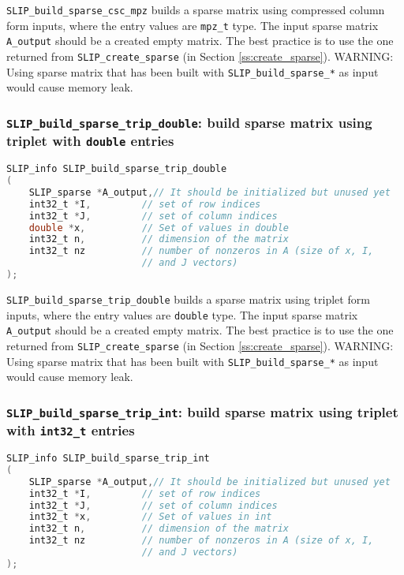 \documentclass[11pt]{article}
\theoremstyle{definition}
\begin{document}
\verb|SLIP_build_sparse_csc_mpz| builds a sparse matrix using compressed column form inputs, where the entry values are \verb|mpz_t| type. The input sparse matrix \verb|A_output| should be a created empty matrix. The best practice is to use the one returned from \verb|SLIP_create_sparse| (in Section \ref{ss:create_sparse}). WARNING: Using sparse matrix that has been built with \verb|SLIP_build_sparse_*| as input would cause memory leak.

\cprotect\subsubsection{\verb|SLIP_build_sparse_trip_double|: build sparse matrix using triplet with \verb|double| entries}\label{s:user:build_sparse_trip_double}
\begin{lstlisting}[language=C,frame=single]
SLIP_info SLIP_build_sparse_trip_double
(
    SLIP_sparse *A_output,// It should be initialized but unused yet
    int32_t *I,         // set of row indices
    int32_t *J,         // set of column indices
    double *x,          // Set of values in double
    int32_t n,          // dimension of the matrix
    int32_t nz          // number of nonzeros in A (size of x, I,
                        // and J vectors)
);
\end{lstlisting}

\verb|SLIP_build_sparse_trip_double| builds a sparse matrix using triplet form inputs, where the entry values are \verb|double| type. The input sparse matrix \verb|A_output| should be a created empty matrix. The best practice is to use the one returned from \verb|SLIP_create_sparse| (in Section \ref{ss:create_sparse}). WARNING: Using sparse matrix that has been built with \verb|SLIP_build_sparse_*| as input would cause memory leak.

\cprotect\subsubsection{\verb|SLIP_build_sparse_trip_int|: build sparse matrix using triplet with \verb|int32_t| entries}\label{s:user:build_sparse_trip_int}
\begin{lstlisting}[language=C,frame=single]
SLIP_info SLIP_build_sparse_trip_int
(
    SLIP_sparse *A_output,// It should be initialized but unused yet
    int32_t *I,         // set of row indices
    int32_t *J,         // set of column indices
    int32_t *x,         // Set of values in int
    int32_t n,          // dimension of the matrix
    int32_t nz          // number of nonzeros in A (size of x, I,
                        // and J vectors)
);
\end{lstlisting}
\end{document}
